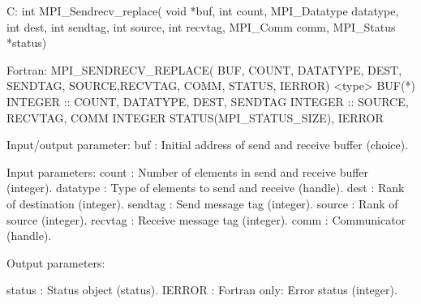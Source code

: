 C:
int MPI_Sendrecv_replace(
    void *buf, int count, MPI_Datatype datatype,
    int dest, int sendtag, int source, int recvtag, 
    MPI_Comm comm, MPI_Status *status)

Fortran:
MPI_SENDRECV_REPLACE(
    BUF, COUNT, DATATYPE,
    DEST, SENDTAG, SOURCE,RECVTAG,
    COMM, STATUS, IERROR)
<type>    BUF(*)
INTEGER :: COUNT, DATATYPE, DEST, SENDTAG
INTEGER :: SOURCE, RECVTAG, COMM
INTEGER    STATUS(MPI_STATUS_SIZE), IERROR

Input/output parameter:
buf : Initial address of send and receive buffer (choice).

Input parameters:
count : Number of elements in send and receive buffer (integer).
datatype : Type of elements to send and receive (handle).
dest : Rank of destination (integer).
sendtag : Send message tag (integer).
source : Rank of source (integer).
recvtag : Receive message tag (integer).
comm : Communicator (handle).

Output parameters:

status : Status object (status).
IERROR : Fortran only: Error status (integer).
